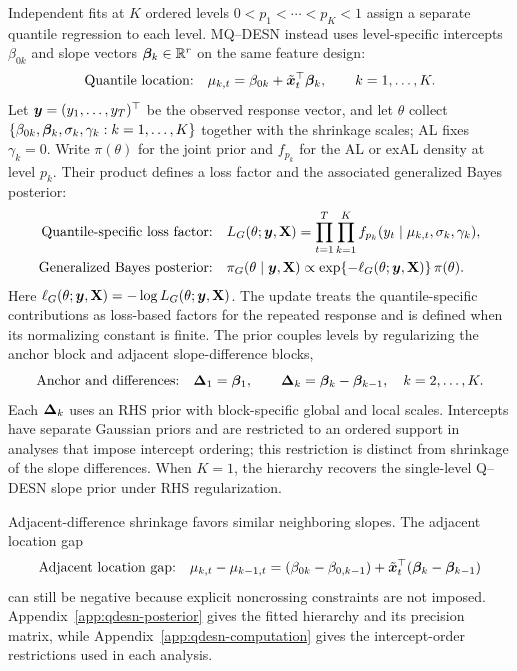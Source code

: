 Independent fits at \(K\) ordered levels \(0<p_1<\cdots<p_K<1\) assign a
separate quantile regression to each level. MQ--DESN instead uses
level-specific intercepts \(\beta_{0k}\) and slope vectors
\(\boldsymbol{\beta}_k\in\mathbb{R}^r\) on the same feature design:
\begin{equation}
\text{Quantile location:}\quad
\mu_{k,t}=\beta_{0k}+\tilde{\boldsymbol{x}}_t^\top\boldsymbol{\beta}_k,
\qquad k=1,\ldots,K.
\label{qdesn2026:eq:joint-qdesn-readout}
\end{equation}
Let \(\boldsymbol{y}=(y_1,\ldots,y_T)^\top\) be the observed response vector,
and let \(\theta\) collect \(\{\beta_{0k},\boldsymbol{\beta}_k,\sigma_k,\gamma_k:
k=1,\ldots,K\}\) together with the shrinkage scales; AL fixes
\(\gamma_k=0\). Write \(\pi(\theta)\) for the joint prior and \(f_{p_k}\)
for the AL or exAL density at level \(p_k\). Their product defines a loss
factor and the associated generalized Bayes posterior:
\begin{equation}
\begin{aligned}
\text{Quantile-specific loss factor:}\quad
&L_G(\theta;\boldsymbol{y},\mathbf{X})
 =\prod_{t=1}^T\prod_{k=1}^K
 f_{p_k}(y_t\mid\mu_{k,t},\sigma_k,\gamma_k),\\
\text{Generalized Bayes posterior:}\quad
&\pi_G(\theta\mid\boldsymbol{y},\mathbf{X})
 \propto\exp\!\left\{-\ell_G(\theta;\boldsymbol{y},\mathbf{X})\right\}\pi(\theta).
\end{aligned}
\label{qdesn2026:eq:joint-generalized-posterior-main}
\end{equation}
Here \(\ell_G(\theta;\boldsymbol{y},\mathbf{X})=-\log L_G(\theta;\boldsymbol{y},\mathbf{X})\).
The update treats the quantile-specific contributions as loss-based factors
for the repeated response and is defined when its normalizing constant is
finite. The prior couples levels by regularizing the anchor block and adjacent
slope-difference blocks,
\[
\text{Anchor and differences:}\quad
\boldsymbol{\Delta}_1=\boldsymbol{\beta}_1,\qquad
\boldsymbol{\Delta}_k=\boldsymbol{\beta}_k-\boldsymbol{\beta}_{k-1},\quad k=2,\ldots,K.
\]
Each \(\boldsymbol{\Delta}_k\) uses an RHS prior with block-specific global and local
scales. Intercepts have separate Gaussian priors and are restricted to an
ordered support in analyses that impose intercept ordering; this restriction
is distinct from shrinkage of the slope differences.
When \(K=1\), the hierarchy
recovers the single-level Q--DESN slope prior under RHS regularization.

Adjacent-difference shrinkage favors similar neighboring slopes. The adjacent
location gap
\[
\text{Adjacent location gap:}\quad
\mu_{k,t}-\mu_{k-1,t}
=(\beta_{0k}-\beta_{0,k-1})
+\tilde{\boldsymbol{x}}_t^\top(\boldsymbol{\beta}_k-\boldsymbol{\beta}_{k-1})
\]
can still be negative because explicit noncrossing constraints are not
imposed. Appendix~\ref{app:qdesn-posterior} gives
the fitted hierarchy and its precision matrix, while
Appendix~\ref{app:qdesn-computation} gives the intercept-order
restrictions used in each analysis.

